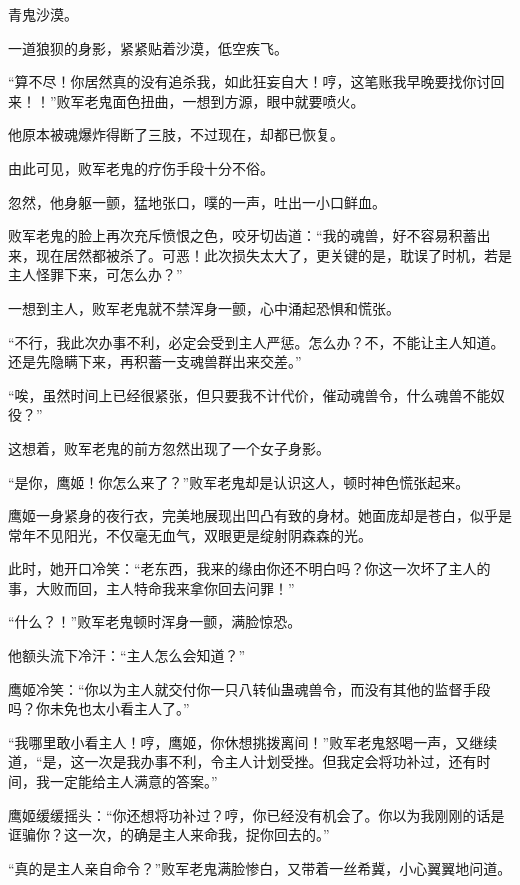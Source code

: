 
\begin{this_body}

青鬼沙漠。

一道狼狈的身影，紧紧贴着沙漠，低空疾飞。

“算不尽！你居然真的没有追杀我，如此狂妄自大！哼，这笔账我早晚要找你讨回来！！”败军老鬼面色扭曲，一想到方源，眼中就要喷火。

他原本被魂爆炸得断了三肢，不过现在，却都已恢复。

由此可见，败军老鬼的疗伤手段十分不俗。

忽然，他身躯一颤，猛地张口，噗的一声，吐出一小口鲜血。

败军老鬼的脸上再次充斥愤恨之色，咬牙切齿道：“我的魂兽，好不容易积蓄出来，现在居然都被杀了。可恶！此次损失太大了，更关键的是，耽误了时机，若是主人怪罪下来，可怎么办？”

一想到主人，败军老鬼就不禁浑身一颤，心中涌起恐惧和慌张。

“不行，我此次办事不利，必定会受到主人严惩。怎么办？不，不能让主人知道。还是先隐瞒下来，再积蓄一支魂兽群出来交差。”

“唉，虽然时间上已经很紧张，但只要我不计代价，催动魂兽令，什么魂兽不能奴役？”

这想着，败军老鬼的前方忽然出现了一个女子身影。

“是你，鹰姬！你怎么来了？”败军老鬼却是认识这人，顿时神色慌张起来。

鹰姬一身紧身的夜行衣，完美地展现出凹凸有致的身材。她面庞却是苍白，似乎是常年不见阳光，不仅毫无血气，双眼更是绽射阴森森的光。

此时，她开口冷笑：“老东西，我来的缘由你还不明白吗？你这一次坏了主人的事，大败而回，主人特命我来拿你回去问罪！”

“什么？！”败军老鬼顿时浑身一颤，满脸惊恐。

他额头流下冷汗：“主人怎么会知道？”

鹰姬冷笑：“你以为主人就交付你一只八转仙蛊魂兽令，而没有其他的监督手段吗？你未免也太小看主人了。”

“我哪里敢小看主人！哼，鹰姬，你休想挑拨离间！”败军老鬼怒喝一声，又继续道，“是，这一次是我办事不利，令主人计划受挫。但我定会将功补过，还有时间，我一定能给主人满意的答案。”

鹰姬缓缓摇头：“你还想将功补过？哼，你已经没有机会了。你以为我刚刚的话是诓骗你？这一次，的确是主人来命我，捉你回去的。”

“真的是主人亲自命令？”败军老鬼满脸惨白，又带着一丝希冀，小心翼翼地问道。


\end{this_body}
